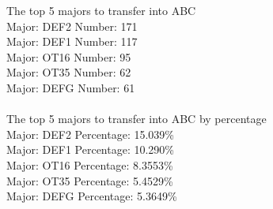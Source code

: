 
The top 5 majors to transfer into ABC\\
Major: DEF2 	Number: 171\\
Major: DEF1 	Number: 117\\
Major: OT16 	Number: 95\\
Major: OT35 	Number: 62\\
Major: DEFG 	Number: 61\\
\\
The top 5 majors to transfer into ABC by percentage\\
Major: DEF2 	Percentage: 15.039\%\\
Major: DEF1 	Percentage: 10.290\%\\
Major: OT16 	Percentage: 8.3553\%\\
Major: OT35 	Percentage: 5.4529\%\\
Major: DEFG 	Percentage: 5.3649\%\\